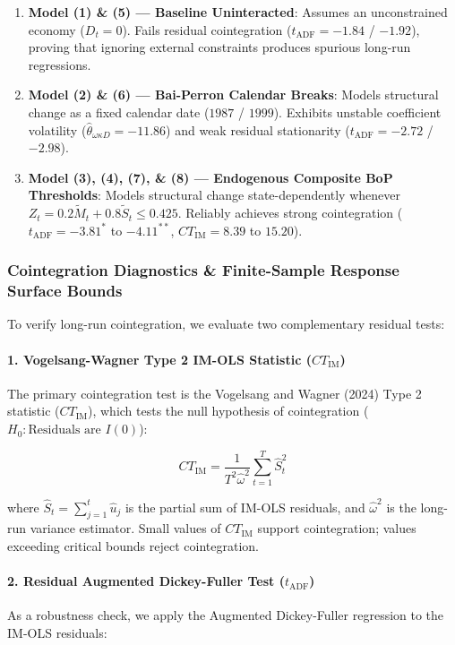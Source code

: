 \begin{enumerate}
    \item \textbf{Model (1) \& (5) --- Baseline Uninteracted}: Assumes an unconstrained economy ($D_t = 0$). Fails residual cointegration ($t_{\text{ADF}} = -1.84$ / $-1.92$), proving that ignoring external constraints produces spurious long-run regressions.
    \item \textbf{Model (2) \& (6) --- Bai-Perron Calendar Breaks}: Models structural change as a fixed calendar date ($1987$ / $1999$). Exhibits unstable coefficient volatility ($\hat{\theta}_{\omega\kappa D} = -11.86$) and weak residual stationarity ($t_{\text{ADF}} = -2.72$ / $-2.98$).
    \item \textbf{Model (3), (4), (7), \& (8) --- Endogenous Composite BoP Thresholds}: Models structural change state-dependently whenever $Z_t = 0.2 \tilde{M}_t + 0.8 \tilde{S}_t \le 0.425$. Reliably achieves strong cointegration ($t_{\text{ADF}} = -3.81^{*}$ to $-4.11^{**}$, $CT_{\text{IM}} = 8.39$ to $15.20$).
\end{enumerate}

\subsubsection{Cointegration Diagnostics \& Finite-Sample Response Surface Bounds}

To verify long-run cointegration, we evaluate two complementary residual tests:

\paragraph{1. Vogelsang-Wagner Type 2 IM-OLS Statistic ($CT_{\text{IM}}$)}
The primary cointegration test is the Vogelsang and Wagner (2024) Type 2 statistic ($CT_{\text{IM}}$), which tests the null hypothesis of cointegration ($H_0: \text{Residuals are } I(0)$):

\begin{equation}
CT_{\text{IM}} = \frac{1}{T^2 \hat{\omega}^2} \sum_{t=1}^{T} \hat{S}_t^2
\end{equation}

where $\hat{S}_t = \sum_{j=1}^{t} \hat{u}_j$ is the partial sum of IM-OLS residuals, and $\hat{\omega}^2$ is the long-run variance estimator. Small values of $CT_{\text{IM}}$ support cointegration; values exceeding critical bounds reject cointegration.

\paragraph{2. Residual Augmented Dickey-Fuller Test ($t_{\text{ADF}}$)}
As a robustness check, we apply the Augmented Dickey-Fuller regression to the IM-OLS residuals:


